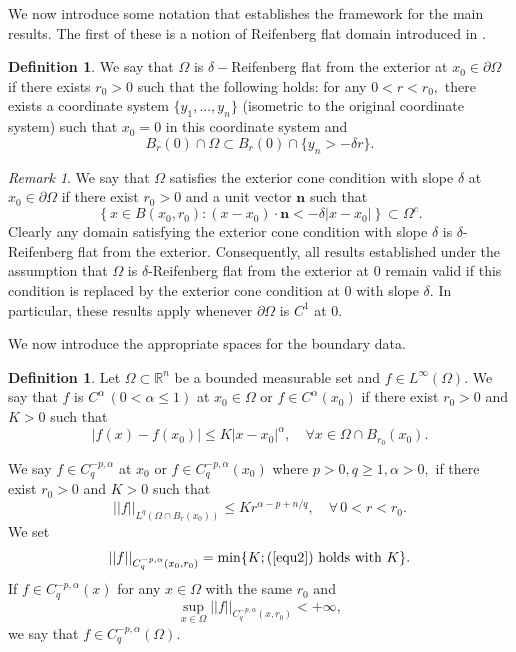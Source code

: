 \documentclass[11pt, leqno]{article}
\theoremstyle{definition}
\newtheorem{definition}[theorem]{Definition}
\theoremstyle{remark}
\newtheorem{remark}[theorem]{Remark}
\numberwithin{equation}{section}
\begin{document}
We now introduce some notation that establishes the framework for the main results. The first of these is a notion of  Reifenberg flat domain introduced in \cite{Et}.

\begin{definition}
  We say that $\Omega$ is $\delta-$Reifenberg flat from the exterior at $x_0\in\partial\Omega$ if there exists $r_0>0$ such that the following holds: for any $0<r<r_0,$ there exists a coordinate system $\{y_1,...,y_n\}$ (isometric to the original coordinate system) such that $x_0=0$ in this coordinate system and
  $$B_r(0)\cap\Omega\subset B_r(0)\cap\{y_n>-\delta r\}. $$
\end{definition}

\begin{remark}
 We say that $\Omega$ satisfies the exterior cone condition with
slope $\delta$ at $x_0\in\partial\Omega$ if there exist $r_0>0$ and a unit vector
$\mathbf{n}$ such that
\[
\left\{
x\in B(x_0,r_0): (x-x_0)\cdot\mathbf{n}
<-\delta|x-x_0|
\right\}
\subset \Omega^c.
\]
Clearly any domain satisfying the exterior cone condition with slope \(\delta\) is \(\delta\)-Reifenberg flat from the exterior. Consequently, all results established under the assumption that \(\Omega\) is \(\delta\)-Reifenberg flat from the exterior at 0 remain valid if this condition is replaced by the exterior cone condition at 0 with slope \(\delta\). In particular, these results apply whenever \(\partial\Omega\) is \(C^1\) at 0.
    
\end{remark}

We now introduce the appropriate spaces for the boundary data.

\begin{definition}
    Let $\Omega\subset\mathbb{R}^n$ be a bounded measurable set and $f\in L^\infty(\Omega).$ We say that $f$ is $C^\alpha\,(0<\alpha\leq 1)$ at $x_0\in \Omega$ or $f\in C^\alpha(x_0)$ if there exist $r_0>0$ and $K>0$ such that
    $$|f(x)-f(x_0)|\leq K|x-x_0|^\alpha,\quad \forall x\in \Omega\cap B_{r_0}(x_0).$$

  We say $f\in C_q^{-p,\alpha}$ at $x_0$ or $f\in C_q^{-p,\alpha}(x_0)$ where $p>0, q\geq 1, \alpha >0,$ if there exist $r_0>0$ and $K>0$ such that
   \begin{equation}\label{equ2}
       ||f||_{L^q(\Omega\cap B_r(x_0))} \leq Kr^{\alpha-p+n/q},\quad\forall\, 0<r<r_0.
   \end{equation}
  We set
   $$||f||_{C_q^{-p,\alpha}(x_0, r_0)}=\min\{K; \text{(\ref{equ2}) holds with}\,\, K \}. $$
 If $f\in C_q^{-p,\alpha}(x)$ for any $x\in \Omega$ with the same $r_0$ and 
  $$ \sup_{x\in \Omega}||f||_{C_q^{-p,\alpha}(x,r_0)}<+\infty, $$
    we say that $f\in C_q^{-p,\alpha}(\Omega).$
\end{definition}
\end{document}
